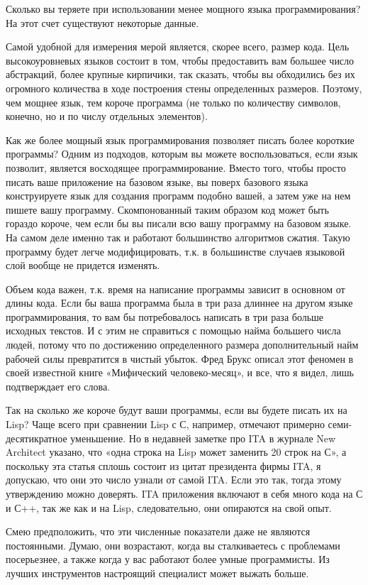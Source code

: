 \documentclass[ebook,12pt,oneside,openany]{memoir}
\begin{document}
Сколько вы теряете при использовании менее мощного языка
программирования? На этот счет существуют некоторые данные.

Самой удобной для измерения мерой является, скорее всего, размер кода.
Цель высокоуровневых языков состоит в том, чтобы предоставить вам
большее число абстракций, более крупные кирпичики, так сказать, чтобы
вы обходились без их огромного количества в ходе построения стены
определенных размеров. Поэтому, чем мощнее язык, тем короче программа
(не только по количеству символов, конечно, но и по числу отдельных
элементов).

Как же более мощный язык программирования позволяет писать более
короткие программы? Одним из подходов, которым вы можете
воспользоваться, если язык позволит, является восходящее
программирование. Вместо того, чтобы просто писать ваше приложение на
базовом языке, вы поверх базового языка конструируете язык для
создания программ подобно вашей, а затем уже на нем пишете вашу
программу. Скомпонованный таким образом код может быть гораздо короче,
чем если бы вы писали всю вашу программу на базовом языке. На самом
деле именно так и работают большинство алгоритмов сжатия. Такую
программу будет легче модифицировать, т.к. в большинстве случаев
языковой слой вообще не придется изменять.

Объем кода важен, т.к. время на написание программы зависит в основном
от длины кода. Если бы ваша программа была в три раза длиннее на
другом языке программирования, то вам бы потребовалось написать в три
раза больше исходных текстов. И с этим не справиться с помощью найма
большего числа людей, потому что по достижению определенного размера
дополнительный найм рабочей силы превратится в чистый убыток. Фред
Брукс описал этот феномен в своей известной книге «Мифический
человеко-месяц», и все, что я видел, лишь подтверждает его слова.

Так на сколько же короче будут ваши программы, если вы будете писать
их на Lisp? Чаще всего при сравнении Lisp с С, например, отмечают
примерно семи-десятикратное уменьшение. Но в недавней заметке про ITA
в журнале New Architect указано, что «одна строка на Lisp может
заменить 20 строк на С», а поскольку эта статья сплошь состоит из
цитат президента фирмы ITA, я допускаю, что они это число узнали от
самой ITA. Если это так, тогда этому утверждению можно доверять. ITA
приложения включают в себя много кода на С и С++, так же как и на
Lisp, следовательно, они опираются на свой опыт.

Смею предположить, что эти численные показатели даже не являются
постоянными. Думаю, они возрастают, когда вы сталкиваетесь с
проблемами посерьезнее, а также когда у вас работают более умные
программисты. Из лучших инструментов настроящий специалист может
выжать больше.
\end{document}
